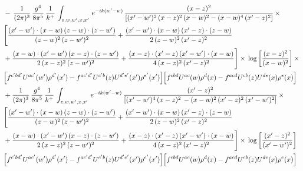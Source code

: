 \documentclass[9pt]{article}
\numberwithin{equation}{section}
\begin{document}
\begin{align}
&  -\, \frac{1}{(2\pi)^{3}}\, \frac{g^{4}}{8\pi^{5}}\,\frac{1}{k^{+}}\,\int_{z,w,w^{\prime},x,x'}\, e^{-ik(w^{\prime}-w)}\, \frac{(x-z)^{2}}{\left[(x'-w')^{2}\,(x-z)^{2}\,(x-w)^{2} - (x-w)^{4}\, (x'-z)^{2}\right]}\,  \times\notag \\ & \Bigg[\frac{(x'-w')\cdot (x-w)\, (z-w)\cdot (z-w')}{(z-w)^{2}\, (z-w')^{2}}+\frac{(x'-w')\cdot (x-w)\, (x'-z)\cdot (z-w)}{2\, (z-w)^{2}\, (x'-z)^{2}}\notag \\ & +\frac{(x-w)\cdot (x'-w')\, (x-z)\cdot (z-w')}{2\, (x-z)^{2}\, (z-w')^{2}}+\frac{(x-z)\cdot (x'-z)\, (x'-w')\cdot (x-w)}{4\, (x-z)^{2}\, (x'-z)^{2}}\Bigg] \times\,\log{\left[\frac{(x-z)^{2}}{(x-w)^{2}}\right]}\,\times \notag \\ & \Big[f^{c'bd'}U^{ac'}(w')\rho^{d'}(x')-f^{ac'd'}U^{c'b}(z)U^{d'e'}(x')\rho^{e'}(x')\Big]\Big[f^{cbd}U^{ac}(w)\rho^{d}(x)-f^{acd}U^{cb}(z)U^{de}(x)\rho^{e}(x)\Big] \notag \\
&  + \frac{1}{(2\pi)^{3}}\, \frac{g^{4}}{8\pi^{5}}\,\frac{1}{k^{+}}\,\int_{z,w,w^{\prime},x,x'}\, e^{-ik(w^{\prime}-w)}\, \frac{(x'-z)^{2}}{\left[(x'-w')^{4}\,(x-z)^{2}\, - (x-w)^{2}\, (x'-z)^{2}\,(x'-w')^{2}\right]}\,  \times\notag \\ & \Bigg[\frac{(x'-w')\cdot (x-w)\, (z-w)\cdot (z-w')}{(z-w)^{2}\, (z-w')^{2}}+\frac{(x'-w')\cdot (x-w)\, (x'-z)\cdot (z-w)}{2\, (z-w)^{2}\, (x'-z)^{2}}\notag \\ & +\frac{(x-w)\cdot (x'-w')\, (x-z)\cdot (z-w')}{2\, (x-z)^{2}\, (z-w')^{2}}+\frac{(x-z)\cdot (x'-z)\, (x'-w')\cdot (x-w)}{4\, (x-z)^{2}\, (x'-z)^{2}}\Bigg] \times\,\log{\left[\frac{(x'-z)^{2}}{(x'-w')^{2}}\right]} \notag \\ & \Big[f^{c'bd'}U^{ac'}(w')\rho^{d'}(x')-f^{ac'd'}U^{c'b}(z)U^{d'e'}(x')\rho^{e'}(x')\Big]\Big[f^{cbd}U^{ac}(w)\rho^{d}(x)-f^{acd}U^{cb}(z)U^{de}(x)\rho^{e}(x)\Big]
\end{align}
\end{document}
